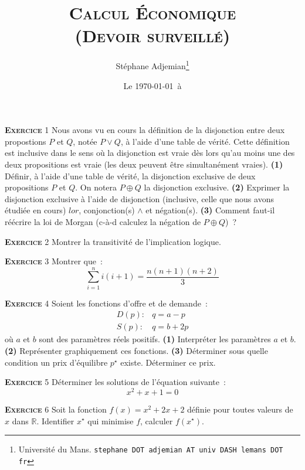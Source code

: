 \documentclass[10pt,a4paper,notitlepage]{article}
\newcommand{\exercice}[1]{\textsc{\textbf{Exercice}} #1}
\providecommand{\lxor}{\oplus}
\begin{document}
\title{\textsc{Calcul Économique\\ \small{(Devoir surveillé)}}}
\author{Stéphane Adjemian\thanks{Université du Mans. \texttt{stephane DOT adjemian AT univ DASH lemans DOT fr}}}
\date{Le \today\ à \thistime}

\maketitle

\exercice{1} Nous avons vu en cours la définition de la disjonction
entre deux propostions $P$ et $Q$, notée $P \lor Q$, à l'aide d'une
table de vérité. Cette définition est inclusive dans le sens où la
disjonction est vraie dès lors qu'au moins une des deux propositions
est vraie (les deux peuvent être simultanément vraies). \textbf{(1)}
Définir, à l'aide d'une table de vérité, la disjonction exclusive
de deux propositions $P$ et $Q$. On notera $P \lxor Q$ la
disjonction exclusive. \textbf{(2)} Exprimer la disjonction exclusive à
l'aide de disjonction (inclusive, celle que nous avons étudiée en
cours) $lor$, conjonction(s) $\land$ et négation(s). \textbf{(3)}
Comment faut-il réécrire la loi de Morgan (c-à-d calculez la négation de
$P\lxor Q$) ?

\bigskip

\exercice{2} Montrer la transitivité de l'implication logique.

\bigskip

\exercice{3} Montrer que :
\[
  \sum_{i=1}^n i(i+1) = \frac{n(n+1)(n+2)}{3}
\]

\bigskip

\exercice{4} Soient les fonctions d'offre et de demande :
\[
\begin{split}
  D(p):& q = a - p\\
  S(p):& q = b + 2p
\end{split}
\] 
où $a$ et $b$ sont des paramètres réels positifs. \textbf{(1)} Interpréter les
paramètres $a$ et $b$. \textbf{(2)} Représenter graphiquement ces
fonctions. \textbf{(3)} Déterminer sous quelle condition un prix d'équilibre
$p^{\star}$ existe. Déterminer ce prix.

\bigskip

\exercice{5} Déterminer les solutions de l'équation suivante :
\[
x^2 + x + 1 = 0
\]

\bigskip

\exercice{6} 
Soit la fonction $f(x) = x^2+2x+2$ définie pour toutes valeurs de $x$
dans $\mathbb R$. Identifier $x^{\star}$ qui minimise $f$, calculer $f(x^{\star})$.
\end{document}
